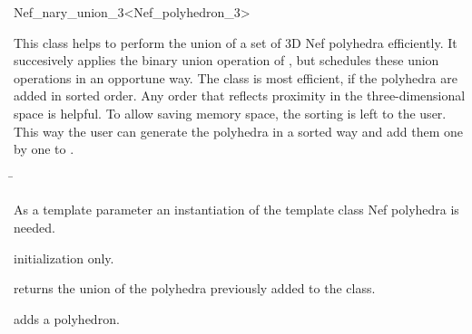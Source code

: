 
\begin{ccRefClass}{Nef_nary_union_3<Nef_polyhedron_3>}

\ccDefinition

This class helps to perform the union of a set of 3D Nef polyhedra
efficiently. It succesively applies the binary union operation of
, but schedules these union operations in an
opportune way. The class is most efficient, if the polyhedra are added
in sorted order. Any order that reflects proximity in the
three-dimensional space is helpful. To allow saving memory space, the
sorting is left to the user. This way the user can generate the
polyhedra in a sorted way and add them one by one to .


\ccParameters

\begin{tabbing}
 \=\\
\end{tabbing}

As a template parameter an instantiation of the template class Nef
polyhedra is needed.

\ccCreation
{}

\ccThreeToTwo
{} {initialization only.}


{returns the union of the polyhedra previously added to the class.}

{adds a polyhedron.}


\end{ccRefClass}
